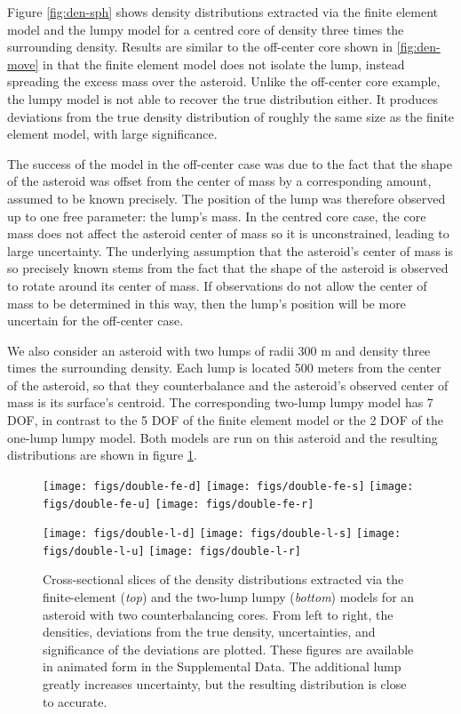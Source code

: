 \documentclass[fleqn,usenatbib]{mnras}
\begin{document}
Figure \ref{fig:den-sph} shows density distributions extracted via the finite element model and the lumpy model for a centred core of density three times the surrounding density. Results are similar to the off-center core shown in \ref{fig:den-move} in that the finite element model does not isolate the lump, instead spreading the excess mass over the asteroid. Unlike the off-center core example, the lumpy model is not able to recover the true distribution either. It produces deviations from the true density distribution of roughly the same size as the finite element model, with large significance.

The success of the model in the off-center case was due to the fact that the shape of the asteroid was offset from the center of mass by a corresponding amount, assumed to be known precisely. The position of the lump was therefore observed up to one free parameter: the lump's mass. In the centred core case, the core mass does not affect the asteroid center of mass so it is unconstrained, leading to large uncertainty. The underlying assumption that the asteroid's center of mass is so precisely known stems from the fact that the shape of the asteroid is observed to rotate around its center of mass. If observations do not allow the center of mass to be determined in this way, then the lump's position will be more uncertain for the off-center case.

We also consider an asteroid with two lumps of radii 300 m and density three times the surrounding density. Each lump is located 500 meters from the center of the asteroid, so that they counterbalance and the asteroid's observed center of mass is its surface's centroid. The corresponding two-lump lumpy model has 7 DOF, in contrast to the 5 DOF of the finite element model or the 2 DOF of the one-lump lumpy model. Both models are run on this asteroid and the resulting distributions are shown in figure \ref{fig:den-double}.

\begin{figure}
  \texttt{[image: figs/double-fe-d]}\hfill
  \texttt{[image: figs/double-fe-s]}\hfill
  \texttt{[image: figs/double-fe-u]}\hfill
  \texttt{[image: figs/double-fe-r]}
  
  \texttt{[image: figs/double-l-d]}\hfill
  \texttt{[image: figs/double-l-s]}\hfill
  \texttt{[image: figs/double-l-u]}\hfill
  \texttt{[image: figs/double-l-r]}

  \caption{Cross-sectional slices of the density distributions extracted via the finite-element (\textit{top}) and the two-lump lumpy (\textit{bottom}) models for an asteroid with two counterbalancing cores. From left to right, the densities, deviations from the true density, uncertainties, and significance of the deviations are plotted. These figures are available in animated form in the Supplemental Data. The additional lump greatly increases uncertainty, but the resulting distribution is close to accurate.}
  \label{fig:den-double}
\end{figure}
\end{document}
